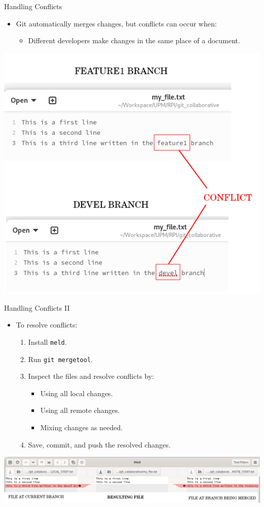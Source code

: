 \begin{frame}{Handling Conflicts}
  \begin{itemize}
    \item Git automatically merges changes, but conflicts can occur when:
      \begin{itemize}
        \item Different developers make changes in the same place of a document.
      \end{itemize}
  \end{itemize}
  \centering
  \includegraphics[width=0.5\linewidth]{trainingmaterials/git-II/conflict.png}
\end{frame}

\begin{frame}{Handling Conflicts II}
  \begin{itemize}
    \item To resolve conflicts:
      \begin{enumerate}
        \item Install \texttt{meld}.
        \item Run \texttt{git mergetool}.
        \item Inspect the files and resolve conflicts by:
          \begin{itemize}
            \item Using all local changes.
            \item Using all remote changes.
            \item Mixing changes as needed.
          \end{itemize}
        \item Save, commit, and push the resolved changes.
      \end{enumerate}
  \end{itemize}
  \centering
  \includegraphics[width=1\linewidth]{trainingmaterials/git-II/meld.png}
\end{frame}

